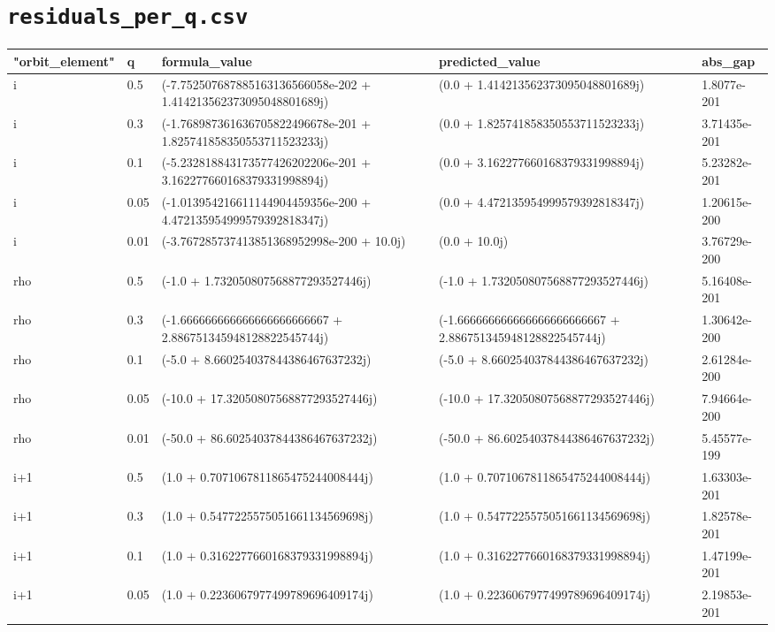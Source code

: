 \documentclass[10pt]{article}
\begin{document}
\section*{\texttt{residuals\_per\_q.csv}}
{\footnotesize
\begin{longtable}{@{}lllll@{}}
\toprule
\textbf{﻿"orbit\_element"} & \textbf{q} & \textbf{formula\_value} & \textbf{predicted\_value} & \textbf{abs\_gap} \\
\midrule\endhead
i & 0.5 & (-7.752507687885163136566058e-202 + 1.414213562373095048801689j) & (0.0 + 1.414213562373095048801689j) & 1.8077e-201 \\
i & 0.3 & (-1.768987361636705822496678e-201 + 1.825741858350553711523233j) & (0.0 + 1.825741858350553711523233j) & 3.71435e-201 \\
i & 0.1 & (-5.232818843173577426202206e-201 + 3.162277660168379331998894j) & (0.0 + 3.162277660168379331998894j) & 5.23282e-201 \\
i & 0.05 & (-1.013954216611144904459356e-200 + 4.472135954999579392818347j) & (0.0 + 4.472135954999579392818347j) & 1.20615e-200 \\
i & 0.01 & (-3.767285737413851368952998e-200 + 10.0j) & (0.0 + 10.0j) & 3.76729e-200 \\
rho & 0.5 & (-1.0 + 1.732050807568877293527446j) & (-1.0 + 1.732050807568877293527446j) & 5.16408e-201 \\
rho & 0.3 & (-1.666666666666666666666667 + 2.886751345948128822545744j) & (-1.666666666666666666666667 + 2.886751345948128822545744j) & 1.30642e-200 \\
rho & 0.1 & (-5.0 + 8.660254037844386467637232j) & (-5.0 + 8.660254037844386467637232j) & 2.61284e-200 \\
rho & 0.05 & (-10.0 + 17.32050807568877293527446j) & (-10.0 + 17.32050807568877293527446j) & 7.94664e-200 \\
rho & 0.01 & (-50.0 + 86.60254037844386467637232j) & (-50.0 + 86.60254037844386467637232j) & 5.45577e-199 \\
i+1 & 0.5 & (1.0 + 0.7071067811865475244008444j) & (1.0 + 0.7071067811865475244008444j) & 1.63303e-201 \\
i+1 & 0.3 & (1.0 + 0.5477225575051661134569698j) & (1.0 + 0.5477225575051661134569698j) & 1.82578e-201 \\
i+1 & 0.1 & (1.0 + 0.3162277660168379331998894j) & (1.0 + 0.3162277660168379331998894j) & 1.47199e-201 \\
i+1 & 0.05 & (1.0 + 0.2236067977499789696409174j) & (1.0 + 0.2236067977499789696409174j) & 2.19853e-201 \\

\end{longtable}}
\end{document}
